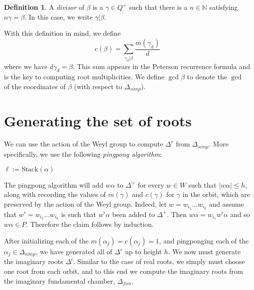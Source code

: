 \documentclass[12pt]{report}
\newcommand{\NN}{\mathbb{N}}
\newcommand{\dfn}[1]{\emph{#1}\index{#1}}
\theoremstyle{definition}
\newtheorem{definition}[theorem]{Definition}
\begin{document}
\begin{definition}
	A \dfn{divisor} of $\beta$ is a $\gamma \in Q^+$ such that there is a $n \in \NN$ satisfying $n\gamma = \beta$. In this case, we write $\gamma|\beta$.
\end{definition}
With this definition in mind, we define
$$c(\beta) = \sum_{\gamma_d|\beta} \frac{m(\gamma_d)}{d}$$
where we have $d\gamma_d = \beta$. This sum appears in the Peterson recurrence formula and is the key to computing root multiplicities.
We define $\gcd \beta$ to denote the $\gcd$ of the coordinates of $\beta$ (with respect to $\Delta_{simp}$).

\section{Generating the set of roots}
We can use the action of the Weyl group to compute $\Delta^r$ from $\Delta_{simp}$. More specifically, we use the following \dfn{pingpong algorithm}:

\begin{algorithm}[H]
	$\ell := \text{Stack}(\alpha)$\;
\end{algorithm}

The pingpong algorithm will add $w\alpha$ to $\Delta^+$ for every $w \in W$ such that $|w\alpha| \leq h$, along with recording the values of $m(\gamma)$ and $c(\gamma)$ for $\gamma$ in the orbit, which are preserved by the action of the Weyl group. Indeed, let $w = w_{i_1} \dots w_{i_k}$ and assume that $w^\flat = w_{i_2} \dots w_{i_k}$ is such that $w^\flat \alpha$ been added to $\Delta^+$. Then $w\alpha = w_{i_1}w^\flat \alpha$ and so $w\alpha \in P$. Therefore the claim follows by induction.

After initializing each of the $m(\alpha_j) = c(\alpha_j) = 1$, and pingponging each of the $\alpha_j \in \Delta_{simp}$, we have generated all of $\Delta^r$ up to height $h$. We now must generate the imaginary roots $\Delta^i$. Similar to the case of real roots, we simply must choose one root from each orbit, and to this end we compute the imaginary roots from the imaginary fundamental chamber, $\Delta_{fun}$.
\end{document}
